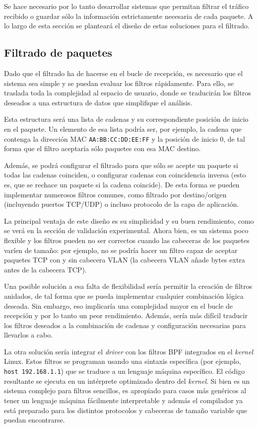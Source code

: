 \documentclass[twoside, 12pt]{epstfg}
\begin{document}
Se hace necesario por lo tanto desarrollar sistemas que permitan filtrar el tráfico recibido o guardar sólo la información estrictamente necesaria de cada paquete. A lo largo de esta sección se planteará el diseño de estas soluciones para el filtrado.

\subsection{Filtrado de paquetes}

Dado que el filtrado ha de hacerse en el bucle de recepción, es necesario que el sistema sea simple y se puedan evaluar los filtros rápidamente. Para ello, se traslada toda la complejidad al espacio de usuario, donde se traducirán los filtros deseados a una estructura de datos que simplifique el análisis.

Esta estructura será una lista de cadenas y su correspondiente posición de inicio en el paquete. Un elemento de esa lista podría ser, por ejemplo, la cadena que contenga la dirección MAC \texttt{AA:BB:CC:DD:EE:FF} y la posición de inicio 0, de tal forma que el filtro aceptaría sólo paquetes con esa MAC destino.

Además, se podrá configurar el filtrado para que sólo se acepte un paquete si todas las cadenas coinciden, o configurar cadenas con coincidencia inversa (esto es, que se rechace un paquete si la cadena coincide). De esta forma se pueden implementar numerosos filtros comunes, como filtrado por destino/origen (incluyendo puertos TCP/UDP) o incluso protocolo de la capa de aplicación.

La principal ventaja de este diseño es su simplicidad y su buen rendimiento, como se verá en la sección de validación experimental. Ahora bien, es un sistema poco flexible y los filtros pueden no ser correctos cuando las cabeceras de los paquetes varíen de tamaño: por ejemplo, no se podría hacer un filtro capaz de aceptar paquetes TCP con y sin cabecera VLAN (la cabecera VLAN añade bytes extra antes de la cabecera TCP).

Una posible solución a esa falta de flexibilidad sería permitir la creación de filtros anidados, de tal forma que se pueda implementar cualquier combinación lógica deseada. Sin embargo, eso implicaría una complejidad mayor en el bucle de recepción y por lo tanto un peor rendimiento. Además, sería más difícil traducir los filtros deseados a la combinación de cadenas y configuración necesarias para llevarlos a cabo.

La otra solución sería integrar el \textit{driver} con los filtros \gls{BPF} \cite{mccanne1993bsd} integrados en el \textit{kernel} Linux. Estos filtros se programan usando una sintaxis específica (por ejemplo, \texttt{host 192.168.1.1}) que se traduce a un lenguaje máquina específico. El código resultante se ejecuta en un intérprete optimizado dentro del \textit{kernel}. Si bien es un sistema complejo para filtros sencillos, es apropiado para casos más genéricos al tener un lenguaje máquina fácilmente interpretable y además el compilador ya está preparado para los distintos protocolos y cabeceras de tamaño variable que puedan encontrarse.
\end{document}
